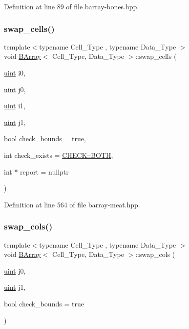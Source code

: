 Definition at line 89 of file barray-\/bones.\+hpp.

\mbox{\label{class_b_array_afb7976f67770b850922c1a7e1d6b07cc}} 
\subsubsection{\texorpdfstring{swap\+\_\+cells()}{swap\_cells()}}
{\footnotesize\ttfamily template$<$typename Cell\+\_\+\+Type , typename Data\+\_\+\+Type $>$ \\
void \hyperlink{class_b_array}{B\+Array}$<$ Cell\+\_\+\+Type, Data\+\_\+\+Type $>$\+::swap\+\_\+cells (\begin{DoxyParamCaption}\item[{\hyperlink{typedefs_8hpp_a91ad9478d81a7aaf2593e8d9c3d06a14}{uint}}]{i0,  }\item[{\hyperlink{typedefs_8hpp_a91ad9478d81a7aaf2593e8d9c3d06a14}{uint}}]{j0,  }\item[{\hyperlink{typedefs_8hpp_a91ad9478d81a7aaf2593e8d9c3d06a14}{uint}}]{i1,  }\item[{\hyperlink{typedefs_8hpp_a91ad9478d81a7aaf2593e8d9c3d06a14}{uint}}]{j1,  }\item[{bool}]{check\+\_\+bounds = {\ttfamily true},  }\item[{int}]{check\+\_\+exists = {\ttfamily \hyperlink{namespace_c_h_e_c_k_a3acda1c74bfabb5b6b67e19d0ad2d52a}{C\+H\+E\+C\+K\+::\+B\+O\+TH}},  }\item[{int $\ast$}]{report = {\ttfamily nullptr} }\end{DoxyParamCaption})\hspace{0.3cm}{\ttfamily [inline]}}



Definition at line 564 of file barray-\/meat.\+hpp.

\mbox{\label{class_b_array_ae94f7e61ca5985244968d9daf2859229}} 
\subsubsection{\texorpdfstring{swap\+\_\+cols()}{swap\_cols()}}
{\footnotesize\ttfamily template$<$typename Cell\+\_\+\+Type , typename Data\+\_\+\+Type $>$ \\
void \hyperlink{class_b_array}{B\+Array}$<$ Cell\+\_\+\+Type, Data\+\_\+\+Type $>$\+::swap\+\_\+cols (\begin{DoxyParamCaption}\item[{\hyperlink{typedefs_8hpp_a91ad9478d81a7aaf2593e8d9c3d06a14}{uint}}]{j0,  }\item[{\hyperlink{typedefs_8hpp_a91ad9478d81a7aaf2593e8d9c3d06a14}{uint}}]{j1,  }\item[{bool}]{check\+\_\+bounds = {\ttfamily true} }\end{DoxyParamCaption})\hspace{0.3cm}{\ttfamily [inline]}}



